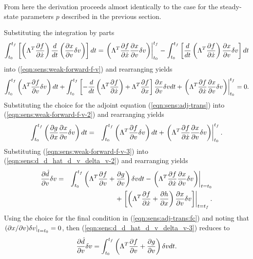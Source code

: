 \documentclass[pdf,ps2pdf,11pt]{SANDreport}
\begin{document}
From here the derivation proceeds almost identically to the case for the
steady-state parameters $p$ described in the previous section.

Substituting the integration by parts
%
\begin{equation}
\int_{t_0}^{t_f} \left[ \left( \Lambda^T \displaystyle{\frac{\partial f}{\partial \dot{x}}} \right) \frac{d}{dt}\left( \displaystyle{\frac{\partial x}{\partial v}} \delta v \right) \right] dt
= \left. \left( \Lambda^T \displaystyle{\frac{\partial f}{\partial \dot{x}}} \displaystyle{\frac{\partial x}{\partial v}} \delta v \right) \right|_{t_0}^{t_f}
- \int_{t_0}^{t_f} \left[ \frac{d}{dt}\left( \Lambda^T \displaystyle{\frac{\partial f}{\partial \dot{x}}} \right) \displaystyle{\frac{\partial x}{\partial v}} \delta v \right] dt
\end{equation}
%
into (\ref{eqn:sens:weak-forward-f-v}) and rearranging yields
%
\begin{equation}
\int_{t_0}^{t_f} \left( \Lambda^T \displaystyle{\frac{\partial f}{\partial v}} \delta v \right) dt
+ \int_{t_0}^{t_f} \left[
    - \frac{d}{dt}\left( \Lambda^T \displaystyle{\frac{\partial f}{\partial \dot{x}}} \right)
    + \Lambda^T \displaystyle{\frac{\partial f}{\partial x}}
  \right] \displaystyle{\frac{\partial x}{\partial v}} \delta v dt
+ \left. \left( \Lambda^T \displaystyle{\frac{\partial f}{\partial \dot{x}}} \displaystyle{\frac{\partial x}{\partial v}} \delta v \right) \right|_{t_0}^{t_f}
= 0.
\label{eqn:sens:weak-forward-f-v-2}
\end{equation}
%
Substituting the choice for the adjoint equation
(\ref{eqn:sens:adj-trans}) into
(\ref{eqn:sens:weak-forward-f-v-2}) and rearranging yields
%
\begin{eqnarray}
\int_{t_0}^{t_f} \left( \displaystyle{\frac{\partial g}{\partial x}} \displaystyle{\frac{\partial x}{\partial v}} \delta v \right) dt
& = &  \int_{t_0}^{t_f} \left( \Lambda^T \displaystyle{\frac{\partial f}{\partial v}} \delta v \right) dt
+ \left. \left( \Lambda^T \displaystyle{\frac{\partial f}{\partial \dot{x}}} \displaystyle{\frac{\partial x}{\partial v}} \delta v \right) \right|^{t_f}_{t_0}.
\label{eqn:sens:weak-forward-f-v-3}
\end{eqnarray}
%
Substituting (\ref{eqn:sens:weak-forward-f-v-3}) into
(\ref{eqn:sens:d_d_hat_d_v_delta_v-2}) and rearranging
yields
%
\begin{eqnarray}
\displaystyle{\frac{\partial \hat{d}}{\partial v}} \delta v 
& = & \int_{t_0}^{t_f} \left( \Lambda^T \displaystyle{\frac{\partial f}{\partial v}} + \displaystyle{\frac{\partial g}{\partial v}} \right) \delta v dt
  - \left. \left( \Lambda^T \displaystyle{\frac{\partial f}{\partial \dot{x}}} \displaystyle{\frac{\partial x}{\partial v}} \delta v \right) \right|_{t=t_0}
\nonumber \\
& & + \left. \left[ \left(
    \Lambda^T \displaystyle{\frac{\partial f}{\partial \dot{x}}} +  \displaystyle{\frac{\partial h}{\partial x}}
  \right)  \displaystyle{\frac{\partial x}{\partial v}} \delta v \right] \right|_{t=t_f}.
\label{eqn:sens:d_d_hat_d_v_delta_v-3}
\end{eqnarray}
%
Using the choice for the final condition in
(\ref{eqn:sens:adj-trans:fc}) and noting that
$\left.(\partial x / \partial v)\delta v\right|_{t=t_0} = 0$, then
(\ref{eqn:sens:d_d_hat_d_v_delta_v-3}) reduces to
%
\begin{equation}
\displaystyle{\frac{\partial \hat{d}}{\partial v}} \delta v 
 = \int_{t_0}^{t_f} \left( \Lambda^T \displaystyle{\frac{\partial f}{\partial v}} + \displaystyle{\frac{\partial g}{\partial v}} \right) \delta v dt.
\label{eqn:sens:d_d_hat_d_v_delta_v-final}
\end{equation}
\end{document}
